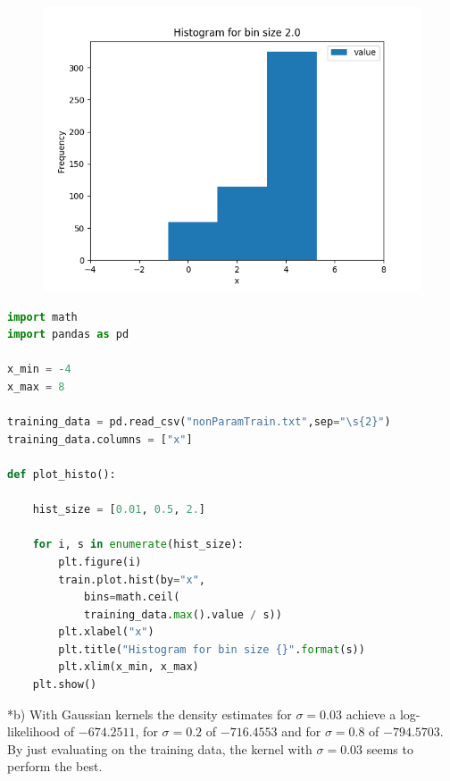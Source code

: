 \documentclass[12pt]{article}
\begin{document}
\begin{section}
\begin{subsection}
\begin{figure}
			\includegraphics[scale=.4]{./hist_2}
		\end{figure}
		
		\newpage
		\begin{lstlisting}[language=python,frame=single]
import math
import pandas as pd	

x_min = -4
x_max = 8	

training_data = pd.read_csv("nonParamTrain.txt",sep="\s{2}")
training_data.columns = ["x"]

def plot_histo():

	hist_size = [0.01, 0.5, 2.]
	
	for i, s in enumerate(hist_size):
		plt.figure(i)
		train.plot.hist(by="x", 
			bins=math.ceil(
			training_data.max().value / s))
		plt.xlabel("x")
		plt.title("Histogram for bin size {}".format(s))
		plt.xlim(x_min, x_max)
	plt.show()
		\end{lstlisting}
	\end{subsection}
	\newpage
	\begin{subsection}*{b)}
		With Gaussian kernels the density estimates for $\sigma=0.03$ achieve a log-likelihood of $-674.2511$, for $\sigma=0.2$ of $-716.4553$ and for $\sigma=0.8$ of $-794.5703$.
		By just evaluating on the training data, the kernel with $\sigma=0.03$ seems to perform the best.\\
		

\end{subsection}
\end{section}
\end{document}
